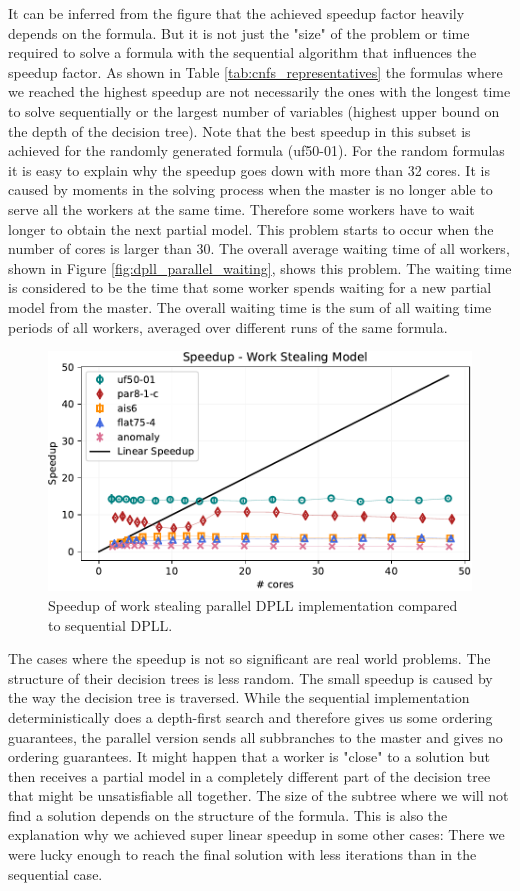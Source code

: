 \documentclass[letterpaper]{article}
\begin{document}
It can be inferred from the figure that the achieved speedup factor heavily depends on the formula.
But it is not just the "size" of the problem or time required to solve a formula with the sequential algorithm that influences the speedup factor.
As shown in Table \ref{tab:cnfs_representatives} the formulas where we reached the highest speedup are not necessarily the ones with the longest time to solve sequentially or the largest number of variables (highest upper bound on the depth of the decision tree).
Note that the best speedup in this subset is achieved for the randomly generated formula (uf50-01).
For the random formulas it is easy to explain why the speedup goes down with more than 32 cores.
It is caused by moments in the solving process when the master is no longer able to serve all the workers at the same time.
Therefore some workers have to wait longer to obtain the next partial model.
This problem starts to occur when the number of cores is larger than 30.
The overall average waiting time of all workers, shown in Figure \ref{fig:dpll_parallel_waiting}, shows this problem.
The waiting time is considered to be the time that some worker spends waiting for a new partial model from the master.
The overall waiting time is the sum of all waiting time periods of all workers, averaged over different runs of the same formula.
\begin{figure}[p]
	\centering
	\includegraphics[width=\columnwidth]{figures/scaling_stealing_subset_dpll_scaling_tar.pdf}
	\caption{Speedup of work stealing parallel DPLL implementation compared to sequential DPLL.
		\label{fig:dpll_stealing_speedup}}
\end{figure}

The cases where the speedup is not so significant are real world problems.
The structure of their decision trees is less random.
The small speedup is caused by the way the decision tree is traversed.
While the sequential implementation deterministically does a depth-first search and therefore gives us some ordering guarantees,
the parallel version sends all subbranches to the master and gives no ordering guarantees.
It might happen that a worker is "close" to a solution but then receives a partial model in a completely different part of the decision tree that might be unsatisfiable all together.
The size of the subtree where we will not find a solution depends on the structure of the formula.
This is also the explanation why we achieved super linear speedup in some other cases:
There we were lucky enough to reach the final solution with less iterations than in the sequential case.
\end{document}

